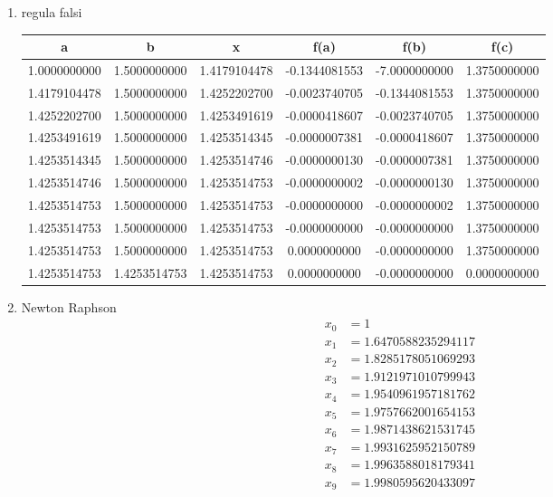 \documentclass[fleqn]{article}
\begin{document}
\begin{enumerate}
\begin{enumerate}[label=\roman*.]
{\begin{tabular}{ |c|c|c|c|c|c| }
							\hline
						\end{tabular}
					}
				\item regula falsi \\
					{\small
						\begin{tabular}{ |c|c|c|c|c|c| } 
							\hline
							a&b&x&f(a)&f(b)&f(c) \\
							\hline
							1.0000000000&1.5000000000&1.4179104478&-0.1344081553&-7.0000000000&1.3750000000\\
							1.4179104478&1.5000000000&1.4252202700&-0.0023740705&-0.1344081553&1.3750000000\\
							1.4252202700&1.5000000000&1.4253491619&-0.0000418607&-0.0023740705&1.3750000000\\
							1.4253491619&1.5000000000&1.4253514345&-0.0000007381&-0.0000418607&1.3750000000\\
							1.4253514345&1.5000000000&1.4253514746&-0.0000000130&-0.0000007381&1.3750000000\\
							1.4253514746&1.5000000000&1.4253514753&-0.0000000002&-0.0000000130&1.3750000000\\
							1.4253514753&1.5000000000&1.4253514753&-0.0000000000&-0.0000000002&1.3750000000\\
							1.4253514753&1.5000000000&1.4253514753&-0.0000000000&-0.0000000000&1.3750000000\\
							1.4253514753&1.5000000000&1.4253514753&0.0000000000&-0.0000000000&1.3750000000\\
							1.4253514753&1.4253514753&1.4253514753&0.0000000000&-0.0000000000&0.0000000000\\
							\hline
						\end{tabular}
					}
				\item Newton Raphson \\ 
					\begin{align*}
						x_0 &= 1\\
						x_1 &= 1.6470588235294117\\
						x_2 &= 1.8285178051069293\\
						x_3 &= 1.9121971010799943\\
						x_4 &= 1.9540961957181762\\
						x_5 &= 1.9757662001654153\\
						x_6 &= 1.9871438621531745\\
						x_7 &= 1.9931625952150789\\
						x_8 &= 1.9963588018179341\\
						x_9 &= 1.9980595620433097\\

\end{align*}
\end{enumerate}
\end{enumerate}
\end{document}
